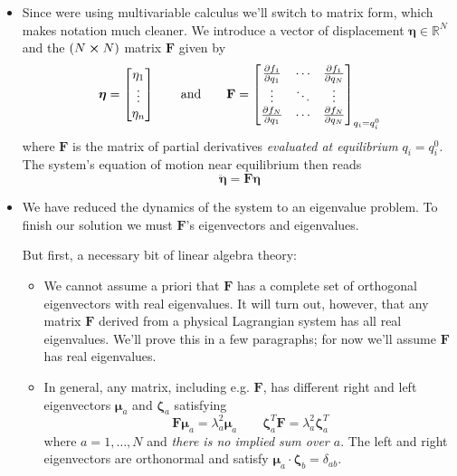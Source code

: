 \documentclass[11pt, a4paper]{article}
\newcommand{\eqtext}[1]{\qquad \text{#1} \qquad}
\newcommand{\R}{\mathbb{R}} %
\newcommand{\mat}[1]{\mathbf{#1}}
\begin{document}
\begin{itemize}
	\item Since were using multivariable calculus we'll switch to matrix form, which makes notation much cleaner. We introduce a vector of displacement $ \bm{\eta} \in \R^{N}$ and the $ (N \cross N) $ matrix $\mat{F}$ given by
	\begin{equation*}
		\bm{\eta} =
		\begin{bmatrix}
			 \eta_1\\
			 \vdots\\
			 \eta_n
		\end{bmatrix}
		\eqtext{and}
		\mathbf{F} =
		\begin{bmatrix}
			\pdv{f_1}{q_1} & \cdots & \pdv{f_1}{q_N}\\
			\vdots & \ddots & \vdots\\
			\pdv{f_N}{q_1} & \cdots & \pdv{f_N}{q_N}\\
		\end{bmatrix}_{q_i = q_{i}^{0}}
	\end{equation*}
	where $ \mat{F} $ is the matrix of partial derivatives \textit{evaluated at equilibrium} $ q_{i} = q_{i}^{0} $. The system's equation of motion near equilibrium then reads
	\begin{equation*}
		\ddot{\bm{\eta}} = \mathbf{F} \bm{\eta}
	\end{equation*}

	\item We have reduced the dynamics of the system to an eigenvalue problem. To finish our solution we must $ \mathbf{F} $'s eigenvectors and eigenvalues. 
	
	But first, a necessary bit of linear algebra theory:
	\begin{itemize}
		\item 	We cannot assume a priori that $ \mat{F} $ has a complete set of orthogonal eigenvectors with real eigenvalues. It will turn out, however, that any matrix $ \mat{F} $ derived from a physical Lagrangian system has all real eigenvalues. We'll prove this in a few paragraphs; for now we'll assume $ \mat{F} $ has real eigenvalues.
		
		\item In general, any matrix, including e.g. $ \mathbf{F} $, has different right and left eigenvectors $ \bm{\mu}_{a} $ and $ \bm{\zeta}_{a} $ satisfying
		\begin{equation*}
			\mathbf{F} \bm{\mu}_{a} = \lambda_a^2 \bm{\mu}_{a}  \qquad  \bm{\zeta}_{a}^{T} \mathbf{F} = \lambda_{a}^{2} \bm{\zeta}_{a}^{T}
		\end{equation*}
		where $ a = 1, \dots, N $ and \textit{there is no implied sum over $ a $}. The left and right eigenvectors are orthonormal and satisfy $ \bm{\mu}_{a} \cdot \bm{\zeta}_{b} = \delta_{ab} $. 
		

\end{itemize}
\end{itemize}
\end{document}

